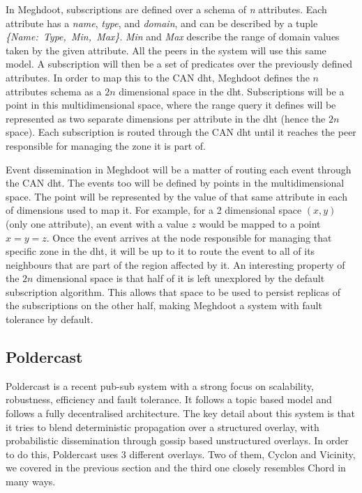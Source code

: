 In Meghdoot, subscriptions are defined over a schema of \emph{n}
attributes. Each attribute has a \emph{name}, \emph{type}, and
\emph{domain}, and can be described by a tuple
\emph{\{Name:\ Type,\ Min,\ Max\}}. \emph{Min} and \emph{Max} describe
the range of domain values taken by the given attribute. All the peers
in the system will use this same model. A subscription will then be a
set of predicates over the previously defined attributes. In order to
map this to the CAN \acrshort{dht}, Meghdoot defines the $n$ attributes schema
as a $2n$ dimensional space in the \acrshort{dht}. Subscriptions will be a
point in this multidimensional space, where the range query it defines
will be represented as two separate dimensions per attribute in the \acrshort{dht}
(hence the $2n$ space). Each subscription is routed through the CAN
\acrshort{dht} until it reaches the peer responsible for managing the zone it is
part of.

Event dissemination in Meghdoot will be a matter of routing each event
through the CAN \acrshort{dht}. The events too will be defined by points in the
multidimensional space. The point will be represented by the value of
that same attribute in each of dimensions used to map it. For example,
for a 2 dimensional space $(x,y)$ (only one attribute), an event
with a value $z$ would be mapped to a point $x=y=z$. Once the
event arrives at the node responsible for managing that specific zone in
the \acrshort{dht}, it will be up to it to route the event to all of its neighbours
that are part of the region affected by it. An interesting property of
the $2n$ dimensional space is that half of it is left unexplored by
the default subscription algorithm. This allows that space to be used to persist
replicas of the subscriptions on the other half, making Meghdoot a
system with fault tolerance by default.

\subsection{Poldercast}\label{poldercast}

Poldercast \cite{Setty2012} is a recent pub-sub system with
a strong focus on scalability, robustness, efficiency and fault
tolerance. It follows a topic based model and follows a fully
decentralised architecture. The key detail about this system is that it
tries to blend deterministic propagation over a structured overlay, with
probabilistic dissemination through gossip based unstructured overlays.
In order to do this, Poldercast uses 3 different overlays. Two of them,
Cyclon and Vicinity, we covered in the previous section and the third
one closely resembles Chord in many ways.

